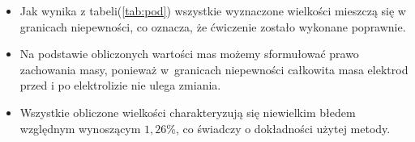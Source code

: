 \documentclass [a4paper,11pt]{article}
\begin{document}
	\begin{itemize}
		\item Jak wynika z tabeli(\ref{tab:pod}) wszystkie wyznaczone wielkości mieszczą się w granicach niepewności, co oznacza, że ćwiczenie zostało wykonane poprawnie.
		\item Na podstawie obliczonych wartości mas możemy sformułować prawo zachowania masy, ponieważ w~granicach niepewności całkowita masa elektrod przed i po elektrolizie nie ulega zmiania. 
		\item Wszystkie obliczone wielkości charakteryzują się niewielkim błedem względnym wynoszącym $1,26$\%, co świadczy o dokładności użytej metody.
	\end{itemize}
	
	
	
\end{document}

